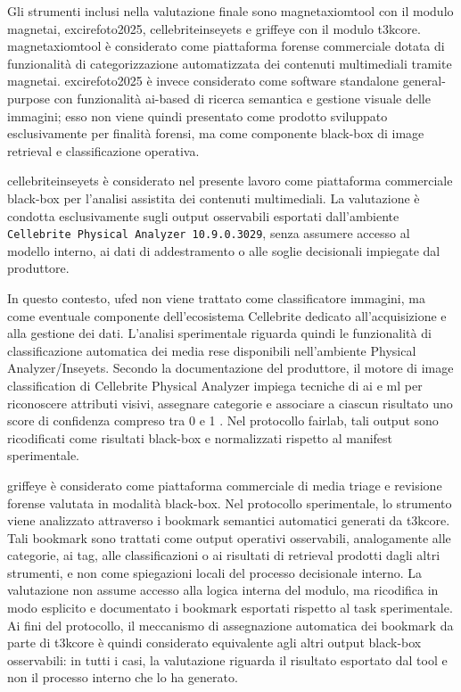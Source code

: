 Gli strumenti inclusi nella valutazione finale sono \gls{magnetaxiomtool} con
il modulo \gls{magnetai}, \gls{excirefoto2025}, \gls{cellebriteinseyets} e
\gls{griffeye} con il modulo \gls{t3kcore}. \gls{magnetaxiomtool} è
considerato come piattaforma forense commerciale dotata di funzionalità di
categorizzazione automatizzata dei contenuti multimediali tramite
\gls{magnetai}. \gls{excirefoto2025} è invece considerato come software
standalone general-purpose con funzionalità \gls{ai}-based di ricerca semantica
e gestione visuale delle immagini; esso non viene quindi presentato come
prodotto sviluppato esclusivamente per finalità forensi, ma come componente
black-box di image retrieval e classificazione operativa.

\gls{cellebriteinseyets} è considerato nel presente lavoro come piattaforma
commerciale black-box per l'analisi assistita dei contenuti multimediali. La
valutazione è condotta esclusivamente sugli output osservabili esportati
dall'ambiente \texttt{Cellebrite Physical Analyzer 10.9.0.3029}, senza assumere
accesso al modello interno, ai dati di addestramento o alle soglie decisionali
impiegate dal produttore.

In questo contesto, \gls{ufed} non viene trattato come classificatore immagini,
ma come eventuale componente dell'ecosistema Cellebrite dedicato
all'acquisizione e alla gestione dei dati. L'analisi sperimentale riguarda
quindi le funzionalità di classificazione automatica dei media rese disponibili
nell'ambiente Physical Analyzer/Inseyets. Secondo la documentazione del
produttore, il motore di image classification di Cellebrite Physical Analyzer
impiega tecniche di \gls{ai} e \gls{ml} per riconoscere attributi visivi,
assegnare categorie e associare a ciascun risultato uno score di confidenza
compreso tra 0 e 1 \cite{cellebrite_media_classification}. Nel protocollo
\gls{fairlab}, tali output sono ricodificati come risultati black-box e
normalizzati rispetto al manifest sperimentale.

\gls{griffeye} è considerato come piattaforma commerciale di media triage e
revisione forense valutata in modalità black-box. Nel protocollo sperimentale,
lo strumento viene analizzato attraverso i bookmark semantici automatici
generati da \gls{t3kcore}. Tali bookmark sono trattati come output operativi
osservabili, analogamente alle categorie, ai tag, alle classificazioni o ai
risultati di retrieval prodotti dagli altri strumenti, e non come spiegazioni
locali del processo decisionale interno. La valutazione non assume accesso alla
logica interna del modulo, ma ricodifica in modo esplicito e documentato i
bookmark esportati rispetto al task sperimentale. Ai fini del protocollo, il
meccanismo di assegnazione automatica dei bookmark da parte di \gls{t3kcore} è
quindi considerato equivalente agli altri output black-box osservabili: in tutti
i casi, la valutazione riguarda il risultato esportato dal tool e non il processo
interno che lo ha generato.


